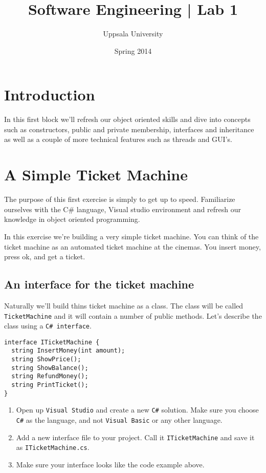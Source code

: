 \documentclass{article}
\newcounter{stepcounter}
\newenvironment{steps}{ 
  \begin{enumerate}[label=\color{red}Step \theenumi)]
    \setcounter{enumi}{\value{stepcounter}}
}{
  \setcounter{stepcounter}{\value{enumi}}
  \end{enumerate}
}
\begin{document}
  \title{ Software Engineering | Lab 1 }
  \author{ Uppsala University }
  \date{ Spring 2014 }
  \maketitle

  \lstset{language=[Sharp]C}







\section*{ Introduction }
In this first block we’ll refresh our object oriented skills and dive into concepts such as constructors, public and private membership, interfaces and inheritance as well as a couple of more technical features such as threads and GUI’s.










\pagebreak
\section{ A Simple Ticket Machine }
The purpose of this first exercise is simply to get up to speed. Familiarize ourselves with the C\# language, Visual studio environment and refresh our knowledge in object oriented programming.

In this exercise we’re building a very simple ticket machine. You can think of the ticket machine as an automated ticket machine at the cinemas. You insert money, press ok, and get a ticket.


\subsection{An interface for the ticket machine}
Naturally we'll build thins ticket machine as a class. The class will be called \texttt{TicketMachine} and it will contain a number of public methods. Let's describe the class using a \texttt{C\# interface}.

\begin{lstlisting}
interface ITicketMachine {
  string InsertMoney(int amount);
  string ShowPrice();
  string ShowBalance();
  string RefundMoney();
  string PrintTicket();
}
\end{lstlisting}
\begin{steps}
\item Open up \texttt{Visual Studio} and create a new \texttt{C\#} solution. Make sure you choose \texttt{C\#} as the language, and not \texttt{Visual Basic} or any other language.
\item Add a new interface file to your project. Call it \texttt{ITicketMachine} and save it as \texttt{ITicketMachine.cs}.
\item Make sure your interface looks like the code example above.
\end{steps}
\end{document}
